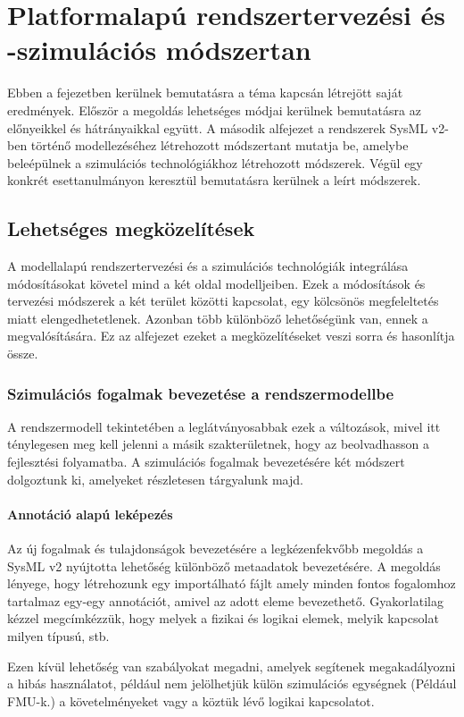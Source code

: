 \chapter{Platformalapú rendszertervezési és -szimulációs módszertan}
Ebben a fejezetben kerülnek bemutatásra a téma kapcsán létrejött saját eredmények. Először a megoldás lehetséges módjai kerülnek bemutatásra az előnyeikkel és hátrányaikkal együtt.
A második alfejezet a rendszerek SysML v2-ben történő modellezéséhez létrehozott módszertant mutatja be, amelybe beleépülnek a szimulációs technológiákhoz létrehozott módszerek.
Végül egy konkrét esettanulmányon keresztül bemutatásra kerülnek a leírt módszerek.

\section{Lehetséges megközelítések}
A modellalapú rendszertervezési és a szimulációs technológiák integrálása módosításokat követel mind a két oldal modelljeiben.
Ezek a módosítások és tervezési módszerek a két terület közötti kapcsolat, egy kölcsönös megfeleltetés miatt elengedhetetlenek.
Azonban több különböző lehetőségünk van, ennek a megvalósítására.
Ez az alfejezet ezeket a megközelítéseket veszi sorra és hasonlítja össze.

    \subsection{Szimulációs fogalmak bevezetése a rendszermodellbe}
    A rendszermodell tekintetében a leglátványosabbak ezek a változások, mivel itt ténylegesen meg kell jelenni a másik szakterületnek, hogy az beolvadhasson a fejlesztési folyamatba.
    A szimulációs fogalmak bevezetésére két módszert dolgoztunk ki, amelyeket részletesen tárgyalunk majd.

        \subsubsection{Annotáció alapú leképezés}
        Az új fogalmak és tulajdonságok bevezetésére a legkézenfekvőbb megoldás a SysML v2 nyújtotta lehetőség különböző metaadatok bevezetésére.
        A megoldás lényege, hogy létrehozunk egy importálható fájlt amely minden fontos fogalomhoz tartalmaz egy-egy annotációt, amivel az adott eleme bevezethető. Gyakorlatilag kézzel megcímkézzük, hogy melyek a fizikai és logikai elemek, melyik kapcsolat milyen típusú, stb.
        
        Ezen kívül lehetőség van szabályokat megadni, amelyek segítenek megakadályozni a hibás használatot, például nem jelölhetjük külön szimulációs egységnek (Például FMU-k.) a követelményeket vagy a köztük lévő logikai kapcsolatot.
        
